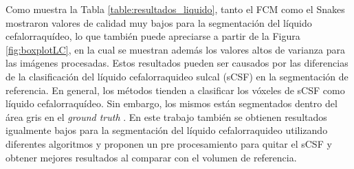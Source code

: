 Como muestra la Tabla \ref{table:resultados_liquido}, tanto el FCM como el Snakes mostraron valores de calidad muy bajos para la segmentación del líquido cefalorraquídeo, lo que también puede apreciarse a partir de la Figura \ref{fig:boxplotLC}, en la cual se muestran además los valores altos de varianza  para las imágenes procesadas.  Estos resultados pueden ser causados por las diferencias de la clasificación del líquido cefalorraquideo sulcal (sCSF) en la segmentación de referencia. En general, los métodos tienden a clasificar los vóxeles de sCSF como líquido cefalorraquídeo. Sin embargo, los mismos están segmentados dentro del área gris en el \emph{ground truth} \citep{valverde2015comparison}. En este trabajo también  se obtienen resultados igualmente bajos para la segmentación del líquido cefalorraquideo utilizando diferentes algoritmos y proponen un pre procesamiento para quitar el sCSF y obtener mejores resultados al comparar con el volumen de referencia.

